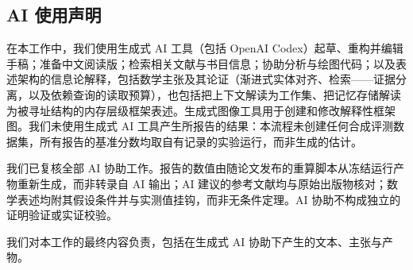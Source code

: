 \subsection*{AI 使用声明}
\label{sec:ai-assistance}

在本工作中，我们使用生成式 AI 工具（包括 OpenAI Codex）起草、重构并编辑手稿；准备中文阅读版；检索相关文献与书目信息；协助分析与绘图代码；以及表述架构的信息论解释，包括数学主张及其论证（渐进式实体对齐、检索——证据分离，以及依赖查询的读取预算），也包括把上下文解读为工作集、把记忆存储解读为被寻址结构的内存层级框架表述。生成式图像工具用于创建和修改解释性框架图。我们未使用生成式 AI 工具产生所报告的结果：本流程未创建任何合成评测数据集，所有报告的基准分数均取自有记录的实验运行，而非生成的估计。

我们已复核全部 AI 协助工作。报告的数值由随论文发布的重算脚本从冻结运行产物重新生成，而非转录自 AI 输出；AI 建议的参考文献均与原始出版物核对；数学表述均附其假设条件并与实测值挂钩，而非无条件定理。AI 协助不构成独立的证明验证或实证校验。

我们对本工作的最终内容负责，包括在生成式 AI 协助下产生的文本、主张与产物。
